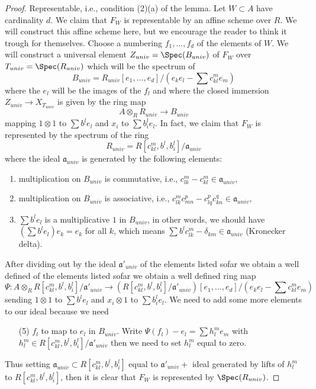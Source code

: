 \begin{proof}
\medskip\noindent
Representable, i.e., condition (2)(a) of the lemma. Let $W \subset A$
have cardinality $d$. We claim that $F_W$ is representable by an affine
scheme over $R$. We will construct this affine scheme here, but we encourage
the reader to think it trough for themselves. Choose a numbering
$f_1, \ldots, f_d$ of the elements of $W$. We will construct a universal
element $Z_{univ} = \Spec(B_{univ})$ of $F_W$ over $T_{univ} = \Spec(R_{univ})$
which will be the spectrum of
$$
B_{univ} = R_{univ}[e_1, \ldots, e_d]/
(e_ke_l - \sum c_{kl}^m e_m)
$$
where the $e_l$ will be the images of the $f_l$
and where the closed immersion $Z_{univ} \to X_{T_{univ}}$ is given
by the ring map
$$
A \otimes_R R_{univ} \longrightarrow B_{univ}
$$
mapping $1 \otimes 1$ to $\sum b^le_l$ and $x_i$ to $\sum b_i^le_l$.
In fact, we claim that $F_W$ is represented by the spectrum of the ring
$$
R_{univ} = R[c_{kl}^m, b^l, b_i^l]/\mathfrak a_{univ}
$$
where the ideal $\mathfrak a_{univ}$ is generated by the
following elements:
\begin{enumerate}
\item multiplication on $B_{univ}$ is commutative, i.e.,
$c_{lk}^m - c_{kl}^m \in \mathfrak a_{univ}$,
\item multiplication on $B_{univ}$ is associative, i.e.,
$c_{lk}^m c_{m n}^p - c_{lq}^p c_{kn}^q \in \mathfrak a_{univ}$,
\item $\sum b^le_l$ is a multiplicative $1$ in $B_{univ}$,
in other words, we should have $(\sum b^le_l)e_k = e_k$ for all $k$,
which means $\sum b^lc_{lk}^m - \delta_{km} \in \mathfrak a_{univ}$
(Kronecker delta).
\end{enumerate}
After dividing out by the ideal $\mathfrak a'_{univ}$ of the elements listed sofar we obtain a well defined of the elements listed sofar we obtain a well
defined ring map
$$
\Psi :
A \otimes_R R[c_{kl}^m, b^l, b_i^l]/\mathfrak a'_{univ}
\longrightarrow
\left(R[c_{kl}^m, b^l, b_i^l]/\mathfrak a'_{univ}\right)
[e_1, \ldots, e_d]/(e_ke_l - \sum c_{kl}^m e_m)
$$
sending $1 \otimes 1$ to $\sum b^le_l$ and $x_i \otimes 1$ to $\sum b_i^le_l$.
We need to add some more elements to our ideal because we need
\begin{enumerate}
\item[(5)] $f_l$ to map to $e_l$ in $B_{univ}$. Write
$\Psi(f_l) - e_l = \sum h_l^me_m$ with
$h_l^m \in R[c_{kl}^m, b^l, b_i^l]/\mathfrak a'_{univ}$
then we need to set $h_l^m$ equal to zero.
\end{enumerate}
Thus setting $\mathfrak a_{univ} \subset R[c_{kl}^m, b^l, b_i^l]$
equal to $\mathfrak a'_{univ} + $ ideal generated by
lifts of $h_l^m$ to $R[c_{kl}^m, b^l, b_i^l]$, then
it is clear that $F_W$ is represented by $\Spec(R_{univ})$.
\end{proof}

